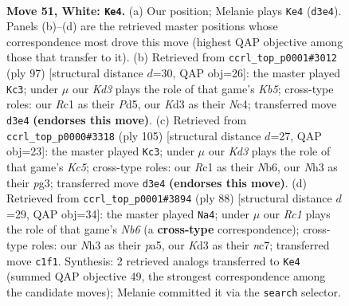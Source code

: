 \documentclass[11pt]{article}
\begin{document}
\clearpage

\begin{figure}[p]\centering
\begin{subfigure}{0.46\textwidth}\centering
\resizebox{\linewidth}{!}{%
\newchessgame
\chessboard[
  setfen={3r4/4kp1p/1r6/p5P1/3p4/1P1K3N/1R5P/2R5 w - - 3 51},
  showmover=false,
  pgfstyle=straightmove, color=movearrow, markmove={d3-e4}
]}
\caption{}
\end{subfigure}\hfill
\begin{subfigure}{0.46\textwidth}\centering
\resizebox{\linewidth}{!}{%
\newchessgame
\chessboard[
  setfen={8/r4p2/8/3p2KP/1knP4/p3PP2/2B5/R7 b - - 0 49},
  showmover=false,
  pgfstyle=straightmove, color=movearrow, markmove={b4-c3}
]}
\caption{}
\end{subfigure}
\\[4pt]
\begin{subfigure}{0.46\textwidth}\centering
\resizebox{\linewidth}{!}{%
\newchessgame
\chessboard[
  setfen={8/r5p1/1n2P2p/p4K1P/2k5/1p4P1/3R4/R7 b - - 0 53},
  showmover=false,
  pgfstyle=straightmove, color=movearrow, markmove={c4-c3}
]}
\caption{}
\end{subfigure}\hfill
\begin{subfigure}{0.46\textwidth}\centering
\resizebox{\linewidth}{!}{%
\newchessgame
\chessboard[
  setfen={3r4/2n1k1p1/1N1p4/pP3p2/2P5/P2R4/5K2/8 w - - 0 45},
  showmover=false,
  pgfstyle=straightmove, color=movearrow, markmove={b6-a4}
]}
\caption{}
\end{subfigure}
\caption{\textbf{Move 51, White: \texttt{Ke4}.} (a) Our position; Melanie plays \texttt{Ke4} (\texttt{d3e4}). Panels (b)--(d) are the retrieved master positions whose correspondence most drove this move (highest QAP objective among those that transfer to it). (b) Retrieved from \texttt{ccrl\_top\_p0001\#3012} (ply 97) [structural distance $d$=30, QAP obj=26]: the master played \texttt{Kc3}; under $\mu$ our \emph{Kd3} plays the role of that game's \emph{Kb5}; cross-type roles: our \emph{R}c1 as their \emph{P}d5, our \emph{K}d3 as their \emph{N}c4; transferred move \texttt{d3e4} \textbf{(endorses this move)}. (c) Retrieved from \texttt{ccrl\_top\_p0000\#3318} (ply 105) [structural distance $d$=27, QAP obj=23]: the master played \texttt{Kc3}; under $\mu$ our \emph{Kd3} plays the role of that game's \emph{Kc5}; cross-type roles: our \emph{R}c1 as their \emph{N}b6, our \emph{N}h3 as their \emph{p}g3; transferred move \texttt{d3e4} \textbf{(endorses this move)}. (d) Retrieved from \texttt{ccrl\_top\_p0001\#3894} (ply 88) [structural distance $d$=29, QAP obj=34]: the master played \texttt{Na4}; under $\mu$ our \emph{Rc1} plays the role of that game's \emph{Nb6} (a \textbf{cross-type} correspondence); cross-type roles: our \emph{N}h3 as their \emph{p}a5, our \emph{K}d3 as their \emph{n}c7; transferred move \texttt{c1f1}. Synthesis: 2 retrieved analogs transferred to \texttt{Ke4} (summed QAP objective 49, the strongest correspondence among the candidate moves); Melanie committed it via the \texttt{search} selector.}
\label{fig:thought-m100}
\end{figure}
\end{document}
